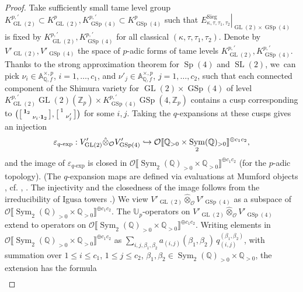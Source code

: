 \documentclass[JEP,XML,SOM,Unicode,published]{cedram}
\newenvironment{smallbmatrix}{\big[\begin{smallmatrix}}{\end{smallmatrix}\big]}
\newcommand\hto{\mathrel{\lhook\joinrel\to}}
\theoremstyle{plain}
\theoremstyle{remark}
\let\mr\mathrm
\newcommand{\bA}{\mathbb{A}}
\newcommand{\bQ}{\mathbb{Q}}
\newcommand{\bU}{\mathbb{U}}
\newcommand{\bZ}{\mathbb{Z}}
\newcommand{\cO}{\mathcal{O}}
\DeclareMathOperator{\GL}{GL}
\DeclareMathOperator{\GSp}{GSp}
\DeclareMathOperator{\SL}{SL}
\DeclareMathOperator{\Sp}{Sp}
\newcommand{\Sieg}{\mr{Sieg}}
\DeclareMathOperator{\Sym}{Sym}
\newcommand{\qexp}{q\text{-}\mathrm{exp}}
\let\llb\llbracket
\let\rrb\rrbracket
\newcommand{\bid}{\mathbf{1}}
\begin{document}
\begin{proof}
Take sufficiently small tame level group $K^{p,\prime}_{\GL(2)}\subset K^p_{\GL(2)},K^{p,\prime}_{\GSp(4)}\subset K^p_{\GSp(4)}$ such that $\left.E^\Sieg_{\kappa,\tau,\tau_1,\tau_2}\right|_{\GL(2)\times\GSp(4)}$ is fixed by $K^{p,\prime}_{\GL(2)},K^{p,\prime}_{\GSp(4)}$ for all classical $(\kappa,\tau,\tau_1,\tau_2)$. Denote by $V'_{\GL(2)},V'_{\GSp(4)}$ the space of $p$-adic forms of tame levels $K^{p,\prime}_{\GL(2)},K^{p,\prime}_{\GSp(4)}$. Thanks to the strong approximation theorem for $\Sp(4)$ and $\SL(2)$, we~can pick $\nu_i\in\bA^{\times,p}_{\bQ,f}$, $i=1,\dots,c_1$, and $\nu'_j\in\bA^{\times,p}_{\bQ,f}$, $j=1,\dots,c_2$, such that each connected component of the Shimura variety for $\GL(2)\times\GSp(4)$ of level $K^{p,\prime}_{\GL(2)}\GL(2)(\bZ_p)\times K^{p,\prime}_{\GSp(4)}\GSp(4,\bZ_p)$ contains a cusp corresponding to $\bigl(\begin{smallbmatrix}\bid_2\\&\nu_i\cdot\bid_2\end{smallbmatrix},\begin{smallbmatrix}1\\&\nu'_j\end{smallbmatrix} \bigr)$ for some $i,j$. Taking the $q$-expansions at these cusps gives an injection
\begin{equation}\label{eq:q-exp}
\varepsilon_{\qexp}:V'_{\GL(2)}\hat{\otimes}_{\cO} V'_{\GSp(4)}
\hto \cO\llb \bQ_{>0}\times \Sym_2(\bQ)_{> 0}\rrb^{\oplus c_1c_2},
\end{equation}
and the image of $\varepsilon_{\qexp}$ is closed in $\cO\llb\Sym_2(\bQ)_{> 0}\times \bQ_{> 0}\rrb^{\oplus c_1c_2}$ (for the $p$-adic topology). (The $q$-expansion maps are defined via evaluations at Mumford objects \hbox{\cite[Ch.\,III]{FC}}, cf. \cite[\S3.4]{HidaCon}, \cite[\S4.2]{EisDiff}. The injectivity and the closedness of the image follows from the irreducibility of Igusa towers \cite[Cor.\,8.17]{HidaPAF}.) We view $V'_{\GL(2)}\hat{\otimes}_{\cO} V'_{\GSp(4)}$ as a subspace of $\cO\llb\Sym_2(\bQ)_{>0}\times \bQ_{> 0}\rrb^{\oplus c_1c_2}$. The $\bU_p$-operators on $V'_{\GL(2)}\hat{\otimes}_{\cO} V'_{\GSp(4)}$ extend to operators on $\cO\llb\Sym_2(\bQ)_{> 0}\times \bQ_{> 0}\rrb^{\oplus c_1c_2}$. Writing elements in $\cO\llb\Sym_2(\bQ)_{> 0}\times \bQ_{> 0}\rrb^{\oplus c_1c_2}$ as $\sum_{i,j,\beta_1,\beta_2} a_{(i,j)}(\beta_1,\beta_2) \,q^{(\beta_1,\beta_2)}_{(i,j)}$, with summation over \hbox{$1\leq i\leq c_1$}, $1\leq j\leq c_2$, $\beta_1,\beta_2\in \Sym_2(\bQ)_{>0}\times \bQ_{> 0}$, the extension has the formula
\begin{multline*}

\end{multline*}
\end{proof}
\end{document}
